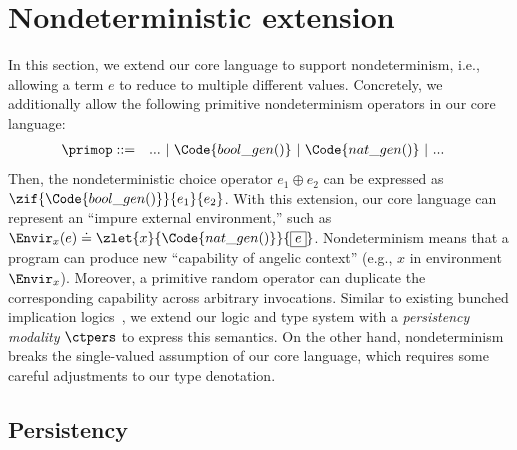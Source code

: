 \section{Nondeterministic extension}\label{sec:extension}

In this section, we extend our core language to support nondeterminism, i.e., allowing a term $e$ to reduce to multiple different values. Concretely, we additionally allow the following primitive nondeterminism operators in our core language:
\begin{align*}
  \primop ::= \quad & ... ~|~ \Code{bool\_gen()} ~|~ \Code{nat\_gen()} ~|~ ...
\end{align*}\noindent
Then, the nondeterministic choice operator $e_1 \oplus e_2$ can be expressed as $\zif{\Code{bool\_gen()}}{e_1}{e_2}$.
With this extension, our core language can represent an ``impure external environment,'' such as $\Envir_x(e) \doteq \zlet{x}{\Code{nat\_gen()}}{\boxed{e}}$. Nondeterminism means that a program can produce new ``capability of angelic context'' (e.g., $x$ in environment $\Envir_x$). Moreover, a primitive random operator can duplicate the corresponding capability across arbitrary invocations. Similar to existing bunched implication logics~\cite{Iris}, we extend our logic and type system with a \emph{persistency modality} $\ctpers$ to express this semantics. On the other hand, nondeterminism breaks the single-valued assumption of our core language, which requires some careful adjustments to our type denotation.

\subsection{Persistency}

